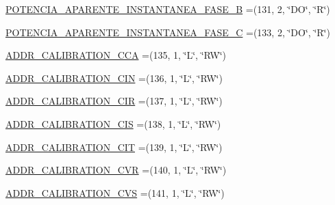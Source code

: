 \begin{DoxyCompactItemize}
\item 
\hyperlink{enumcom_1_1eneri_1_1scorpio__metertool_1_1devices_1_1_register_aea1518a7e05912d2296ab7974508c527}{P\+O\+T\+E\+N\+C\+I\+A\+\_\+\+A\+P\+A\+R\+E\+N\+T\+E\+\_\+\+I\+N\+S\+T\+A\+N\+T\+A\+N\+E\+A\+\_\+\+F\+A\+S\+E\+\_\+B} =(131, 2, \char`\"{}DO\char`\"{}, \char`\"{}R\char`\"{})
\item 
\hyperlink{enumcom_1_1eneri_1_1scorpio__metertool_1_1devices_1_1_register_a1b29f25672b4d233c4f5e77b266efb6c}{P\+O\+T\+E\+N\+C\+I\+A\+\_\+\+A\+P\+A\+R\+E\+N\+T\+E\+\_\+\+I\+N\+S\+T\+A\+N\+T\+A\+N\+E\+A\+\_\+\+F\+A\+S\+E\+\_\+C} =(133, 2, \char`\"{}DO\char`\"{}, \char`\"{}R\char`\"{})
\item 
\hyperlink{enumcom_1_1eneri_1_1scorpio__metertool_1_1devices_1_1_register_a31f9317eacf4e891bf8b2ec1f5e366d4}{A\+D\+D\+R\+\_\+\+C\+A\+L\+I\+B\+R\+A\+T\+I\+O\+N\+\_\+\+C\+CA} =(135, 1, \char`\"{}L\char`\"{}, \char`\"{}RW\char`\"{})
\item 
\hyperlink{enumcom_1_1eneri_1_1scorpio__metertool_1_1devices_1_1_register_ab929a0296c2d9b3b650d41ce07b61a9b}{A\+D\+D\+R\+\_\+\+C\+A\+L\+I\+B\+R\+A\+T\+I\+O\+N\+\_\+\+C\+IN} =(136, 1, \char`\"{}L\char`\"{}, \char`\"{}RW\char`\"{})
\item 
\hyperlink{enumcom_1_1eneri_1_1scorpio__metertool_1_1devices_1_1_register_abd53ee1fb3ff3d7879862b618aeeaa0a}{A\+D\+D\+R\+\_\+\+C\+A\+L\+I\+B\+R\+A\+T\+I\+O\+N\+\_\+\+C\+IR} =(137, 1, \char`\"{}L\char`\"{}, \char`\"{}RW\char`\"{})
\item 
\hyperlink{enumcom_1_1eneri_1_1scorpio__metertool_1_1devices_1_1_register_abd61fcca5e56f382e00da0047b2271a8}{A\+D\+D\+R\+\_\+\+C\+A\+L\+I\+B\+R\+A\+T\+I\+O\+N\+\_\+\+C\+IS} =(138, 1, \char`\"{}L\char`\"{}, \char`\"{}RW\char`\"{})
\item 
\hyperlink{enumcom_1_1eneri_1_1scorpio__metertool_1_1devices_1_1_register_a258c3a1b75397fd90b3c93d25ba1acb4}{A\+D\+D\+R\+\_\+\+C\+A\+L\+I\+B\+R\+A\+T\+I\+O\+N\+\_\+\+C\+IT} =(139, 1, \char`\"{}L\char`\"{}, \char`\"{}RW\char`\"{})
\item 
\hyperlink{enumcom_1_1eneri_1_1scorpio__metertool_1_1devices_1_1_register_a714881f62c101feefd117d8c65fa2872}{A\+D\+D\+R\+\_\+\+C\+A\+L\+I\+B\+R\+A\+T\+I\+O\+N\+\_\+\+C\+VR} =(140, 1, \char`\"{}L\char`\"{}, \char`\"{}RW\char`\"{})
\item 
\hyperlink{enumcom_1_1eneri_1_1scorpio__metertool_1_1devices_1_1_register_a673d761b77b509416ced983e30d0c0e7}{A\+D\+D\+R\+\_\+\+C\+A\+L\+I\+B\+R\+A\+T\+I\+O\+N\+\_\+\+C\+VS} =(141, 1, \char`\"{}L\char`\"{}, \char`\"{}RW\char`\"{})

\end{DoxyCompactItemize}

